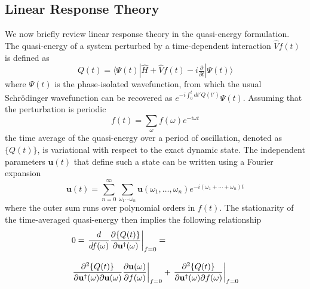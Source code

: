 \subsection{Linear Response Theory}
\label{sec:lr}
We now briefly review linear response theory in the quasi-energy
formulation.\cite{Norman:2011p20519}
The quasi-energy of a system perturbed by a time-dependent interaction
\(\hat{V}f(t)\) is defined as
\begin{equation}
    Q(t)
    =
    \langle\Psi(t)|
    \hat{H} + \hat{V} f(t) - i\tfrac{\partial}{\partial t}
    |\Psi(t)\rangle
\end{equation}
where \(\Psi(t)\) is the phase-isolated wavefunction, from which the usual
Schr\"odinger wavefunction can be recovered as
\(
    e^{-i\int_0^t dt' Q(t')}
    \Psi(t)
\).
Assuming that the perturbation is periodic
\begin{equation}
    f(t)
    =
    \sum_\omega f(\omega) e^{-i\omega t}
\end{equation}
the time average of the quasi-energy over a period of oscillation, denoted as 
\(
    \{Q(t)\}
\),
is variational with respect to the exact dynamic state.\cite{Helgaker:2012p543}
The independent parameters \(\mathbf{u}(t)\) that define such a state can be
written using a Fourier expansion
\begin{equation}
    \label{eq:parameter-fourier-expansion}
    \mathbf{u}(t)
    =
    \sum_{n=0}^\infty
    \sum_{\omega_1\cdots \omega_n}
    \mathbf{u}(\omega_1,\ldots, \omega_n)
    e^{-i(\omega_1+\cdots+\omega_n)t}
\end{equation}
where the outer sum runs over polynomial orders in \(f(t)\).
The stationarity of the time-averaged quasi-energy then implies the following
relationship\cite{Kristensen:2009p044112}
\begin{equation}
    \label{eq:linear-response-equation}
    \begin{array}{l}
        0
        =
        \left.
            \dfrac{d}{df(\omega)}
            \dfrac{%
                \partial \{Q(t)\}
            }{%
                \partial \mathbf{u}^\dagger(\omega)
            }
        \right|_{f=0}
        =
        \\[20pt]
        \left.
            \dfrac{%
                \partial^2 \{Q(t)\}
            }{%
                \partial \mathbf{u}^\dagger(\omega)
                \partial \mathbf{u}(\omega)
            }
            \dfrac{\partial \mathbf{u}(\omega)}{\partial f(\omega)}
        \right|_{f=0}
            +
        \left.
            \dfrac{%
                \partial^2 \{Q(t)\}
            }{%
                \partial \mathbf{u}^\dagger(\omega)
                \partial f(\omega)
            }
        \right|_{f=0}
    \end{array}
\end{equation}
